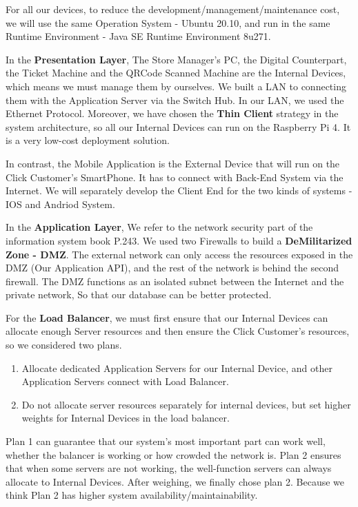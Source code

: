 \documentclass[a4paper,12pt]{report}
\begin{document}
For all our devices, to reduce the development/management/maintenance cost,
we will use the same Operation System - Ubuntu 20.10, and run in the same Runtime Environment - Java SE Runtime Environment 8u271.

In the \textbf{Presentation Layer}, The Store Manager's PC, the Digital Counterpart, the Ticket Machine and the QRCode Scanned Machine are the Internal Devices, which means we must manage them by ourselves.
We built a LAN to connecting them with the Application Server via the Switch Hub.
In our LAN, we used the Ethernet Protocol.
Moreover, we have chosen the \textbf{Thin Client} strategy in the system architecture, so all our Internal Devices can run on the Raspberry Pi 4.
It is a very low-cost deployment solution.

In contrast, the Mobile Application is the External Device that will run on the Click Customer's SmartPhone.
It has to connect with Back-End System via the Internet.
We will separately develop the Client End for the two kinds of systems - IOS and Andriod System.

In the \textbf{Application Layer}, We refer to the network security part of the information system book P.243.
We used two Firewalls to build a \textbf{DeMilitarized Zone - DMZ}.
The external network can only access the resources exposed in the DMZ (Our Application API), and the rest of the network is behind the second firewall.
The DMZ functions as an isolated subnet between the Internet and the private network,
So that our database can be better protected.\cite{SistemiInformativi}

For the \textbf{Load Balancer}, we must first ensure that our Internal Devices can allocate enough Server resources and then ensure the Click Customer's resources, so we considered two plans.
\begin{enumerate}
	\item Allocate dedicated Application Servers for our Internal Device, and other Application Servers connect with Load Balancer.
	\item Do not allocate server resources separately for internal devices, but set higher weights for Internal Devices in the load balancer.
\end{enumerate}
Plan 1 can guarantee that our system's most important part can work well, whether the balancer is working or how crowded the network is.
Plan 2 ensures that when some servers are not working, the well-function servers can always allocate to Internal Devices.
After weighing, we finally chose plan 2.
Because we think Plan 2 has higher system availability/maintainability.
\end{document}
